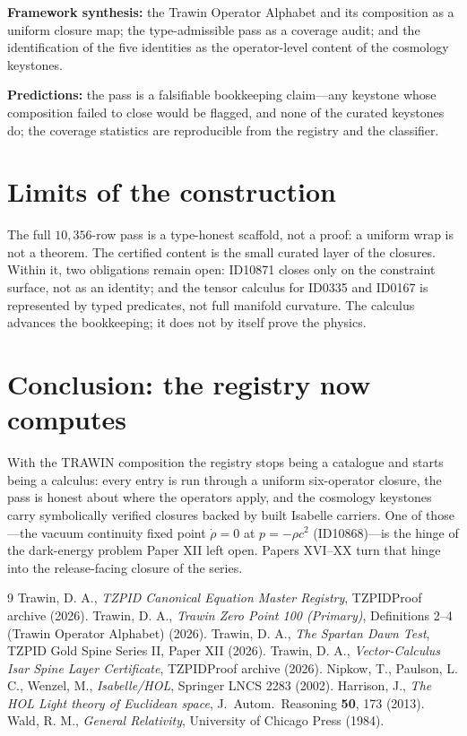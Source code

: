 \documentclass[11pt]{article}
\theoremstyle{remark}
\begin{document}
\textbf{Framework synthesis:} the Trawin Operator Alphabet and its composition as a uniform closure map; the type-admissible pass as a coverage audit; and the identification of the five identities as the operator-level content of the cosmology keystones.

\textbf{Predictions:} the pass is a falsifiable bookkeeping claim---any keystone whose composition failed to close would be flagged, and none of the curated keystones do; the coverage statistics are reproducible from the registry and the classifier.
\section{Limits of the construction}
The full $10{,}356$-row pass is a type-honest scaffold, not a proof: a uniform wrap is not a theorem. The certified content is the small curated layer of the closures. Within it, two obligations remain open: ID10871 closes only on the constraint surface, not as an identity; and the tensor calculus for ID0335 and ID0167 is represented by typed predicates, not full manifold curvature. The calculus advances the bookkeeping; it does not by itself prove the physics.
\section{Conclusion: the registry now computes}
With the TRAWIN composition the registry stops being a catalogue and starts being a calculus: every entry is run through a uniform six-operator closure, the pass is honest about where the operators apply, and the cosmology keystones carry symbolically verified closures backed by built Isabelle carriers. One of those---the vacuum continuity fixed point $\dot\rho = 0$ at $p = -\rho c^2$ (ID10868)---is the hinge of the dark-energy problem Paper XII left open. Papers XVI--XX turn that hinge into the release-facing closure of the series.
\begin{thebibliography}{9}
 Trawin, D. A., \emph{TZPID Canonical Equation Master Registry}, TZPIDProof archive (2026).
 Trawin, D. A., \emph{Trawin Zero Point 100 (Primary)}, Definitions 2--4 (Trawin Operator Alphabet) (2026).
 Trawin, D. A., \emph{The Spartan Dawn Test}, TZPID Gold Spine Series II, Paper XII (2026).
 Trawin, D. A., \emph{Vector-Calculus Isar Spine Layer Certificate}, TZPIDProof archive (2026).
 Nipkow, T., Paulson, L. C., Wenzel, M., \emph{Isabelle/HOL}, Springer LNCS 2283 (2002).
 Harrison, J., \emph{The HOL Light theory of Euclidean space}, J.\ Autom.\ Reasoning \textbf{50}, 173 (2013).
 Wald, R. M., \emph{General Relativity}, University of Chicago Press (1984).
\end{thebibliography}
\end{document}
